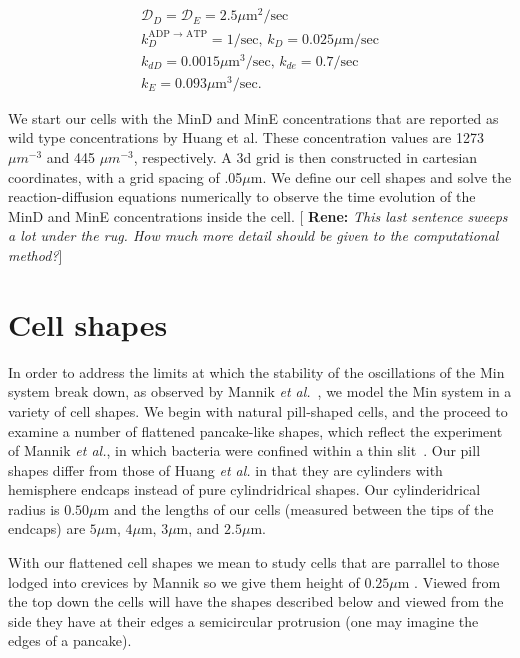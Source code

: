 \documentclass[letterpaper,twocolumn,amsmath,amssymb,pre]{revtex4-1}
\newcommand{\blue}[1]{{\bf \color{blue} #1}}
\newcommand{\renesays}[1]{{\color{red} [\blue{Rene:} \emph{#1}]}}
\newcommand\micron{\ensuremath{\mu\text{m}}}
\begin{document}
\begin{gather*}
  \mathcal{D}_D = \mathcal{D}_{E} = 2.5\micron^2/\text{sec}\\
  k_D^{\textrm{ADP $\rightarrow$ ATP}} = 1/\textrm{sec,  }
  k_D = 0.025 \micron /\textrm{sec}\\
  k_{dD} = 0.0015 \micron^3/ \textrm{sec,  }
  k_{de} = 0.7/\textrm{sec}\\
  k_E = 0.093 \micron^3 /\textrm{sec}.
\end{gather*}

We start our cells with the MinD and MinE concentrations that are
reported as wild type concentrations by Huang et al. These
concentration values are 1273 $\mu m^{-3}$ and 445 $\mu m^{-3}$,
respectively. A 3d grid is then constructed in cartesian coordinates,
with a grid spacing of .05\micron. We define our cell shapes and solve
the reaction-diffusion equations numerically to observe the time
evolution of the MinD and MinE concentrations inside the
cell. \renesays{This last sentence sweeps a lot under the rug. How
  much more detail should be given to the computational method?}

\section{Cell shapes}

In order to address the limits at which the stability of the
oscillations of the Min system break down, as observed by Mannik
\emph{et al.}~\cite{mannik2012robustness}, we model the Min system in
a variety of cell shapes.  We begin with natural pill-shaped cells,
and the proceed to examine a number of flattened pancake-like shapes,
which reflect the experiment of Mannik \emph{et al.}, in which
bacteria were confined within a thin slit~\cite{mannik2012robustness}.
Our pill shapes differ from those of Huang \emph{et al.} in that they
are cylinders with hemisphere endcaps instead of pure cylindridrical
shapes.  Our
cylinderidrical radius is $0.50\micron$ and the lengths of our cells
(measured between the tips of the endcaps) are $5\micron$, $4\micron$, $3\micron$,
and $2.5\micron$.

With our flattened cell shapes we mean to study cells that are
parrallel to those lodged into crevices by Mannik so we give them
height of $0.25\micron$ \cite{mannik2012robustness}.  Viewed from the top
down the cells will have the shapes described below and viewed from
the side they have at their edges a semicircular protrusion (one may
imagine the edges of a pancake).
\end{document}

